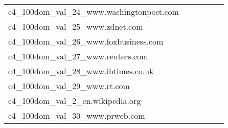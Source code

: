 {\begin{longtable}{m{6cm}m{1.7cm}m{1.7cm}m{1.7cm}m{1.7cm}m{1.7cm}}
	c4\_100dom\_val\_24\_www.washingtonpost.com  & \colorbox[HTML]{fcfed8}{\makebox[\mywidth][c]{12.06}} & \colorbox[HTML]{cdeb9d}{\makebox[\mywidth][c]{11.58}} & \colorbox[HTML]{ffffe5}{\makebox[\mywidth][c]{12.98}} & \colorbox[HTML]{dff2a7}{\makebox[\mywidth][c]{11.64}} & \colorbox[HTML]{77c578}{\makebox[\mywidth][c]{11.41}}\\
	c4\_100dom\_val\_25\_www.zdnet.com  & \colorbox[HTML]{fefee0}{\makebox[\mywidth][c]{13.22}} & \colorbox[HTML]{eff8b3}{\makebox[\mywidth][c]{12.86}} & \colorbox[HTML]{ffffe5}{\makebox[\mywidth][c]{13.80}} & \colorbox[HTML]{ddf1a6}{\makebox[\mywidth][c]{12.78}} & \colorbox[HTML]{77c578}{\makebox[\mywidth][c]{12.61}}\\
	c4\_100dom\_val\_26\_www.foxbusiness.com  & \colorbox[HTML]{ffffe5}{\makebox[\mywidth][c]{9.32}} & \colorbox[HTML]{f8fcc3}{\makebox[\mywidth][c]{9.03}} & \colorbox[HTML]{ffffe5}{\makebox[\mywidth][c]{9.58}} & \colorbox[HTML]{def2a6}{\makebox[\mywidth][c]{8.92}} & \colorbox[HTML]{77c578}{\makebox[\mywidth][c]{8.81}}\\
	c4\_100dom\_val\_27\_www.reuters.com  & \colorbox[HTML]{fefee3}{\makebox[\mywidth][c]{10.67}} & \colorbox[HTML]{d8efa2}{\makebox[\mywidth][c]{10.13}} & \colorbox[HTML]{ffffe5}{\makebox[\mywidth][c]{11.16}} & \colorbox[HTML]{d9f0a3}{\makebox[\mywidth][c]{10.13}} & \colorbox[HTML]{77c578}{\makebox[\mywidth][c]{9.97}}\\
	c4\_100dom\_val\_28\_www.ibtimes.co.uk  & \colorbox[HTML]{ffffe5}{\makebox[\mywidth][c]{11.36}} & \colorbox[HTML]{f8fcc1}{\makebox[\mywidth][c]{11.01}} & \colorbox[HTML]{ffffe5}{\makebox[\mywidth][c]{11.71}} & \colorbox[HTML]{dcf1a5}{\makebox[\mywidth][c]{10.89}} & \colorbox[HTML]{77c578}{\makebox[\mywidth][c]{10.76}}\\
	c4\_100dom\_val\_29\_www.rt.com  & \colorbox[HTML]{fefee3}{\makebox[\mywidth][c]{13.59}} & \colorbox[HTML]{ddf1a6}{\makebox[\mywidth][c]{12.96}} & \colorbox[HTML]{ffffe5}{\makebox[\mywidth][c]{14.24}} & \colorbox[HTML]{e3f4aa}{\makebox[\mywidth][c]{12.98}} & \colorbox[HTML]{77c578}{\makebox[\mywidth][c]{12.74}}\\
	c4\_100dom\_val\_2\_en.wikipedia.org  & \colorbox[HTML]{fdfedf}{\makebox[\mywidth][c]{10.75}} & \colorbox[HTML]{f5fbb8}{\makebox[\mywidth][c]{10.45}} & \colorbox[HTML]{ffffe5}{\makebox[\mywidth][c]{11.32}} & \colorbox[HTML]{d4eea0}{\makebox[\mywidth][c]{10.32}} & \colorbox[HTML]{77c578}{\makebox[\mywidth][c]{10.19}}\\
	c4\_100dom\_val\_30\_www.prweb.com  & \colorbox[HTML]{fcfed9}{\makebox[\mywidth][c]{11.18}} & \colorbox[HTML]{e9f6af}{\makebox[\mywidth][c]{10.88}} & \colorbox[HTML]{ffffe5}{\makebox[\mywidth][c]{11.92}} & \colorbox[HTML]{ddf1a6}{\makebox[\mywidth][c]{10.83}} & \colorbox[HTML]{77c578}{\makebox[\mywidth][c]{10.65}}\\

\end{longtable}}
